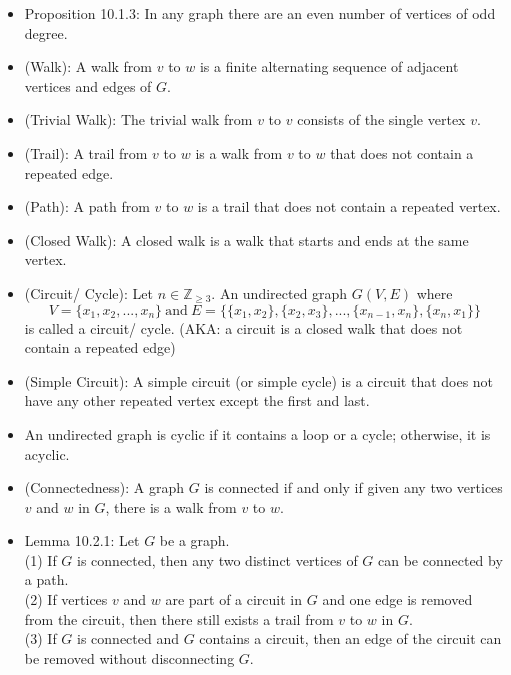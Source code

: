 \documentclass{article}
\begin{document}
\begin{itemize}
    \item Proposition 10.1.3: In any graph there are an even number of vertices of odd degree.
    \item (Walk): A walk from $v$ to $w$ is a finite alternating sequence of adjacent vertices and edges of $G$.
    \item (Trivial Walk): The trivial walk from $v$ to $v$ consists of the single vertex $v$.
    \item (Trail): A trail from $v$ to $w$ is a walk from $v$ to $w$ that does not contain a repeated edge.
    \item (Path): A path from $v$ to $w$ is a trail that does not contain a repeated vertex.
    \item (Closed Walk): A closed walk is a walk that starts and ends at the same vertex.
    \item (Circuit/ Cycle): Let $n\in \mathbb{Z}_{\geqslant 3}$. An undirected graph $G(V, E)$ where 
        \begin{equation*}
            V=\{x_1,x_2,...,x_n\}\ \text{and}\ E=\{\{x_1,x_2\},\{x_2,x_3\},...,\{x_{n-1},x_n\},\{x_n,x_1\}\}
        \end{equation*}
        is called a circuit/ cycle. (AKA: a circuit is a closed walk that does not contain a repeated edge)
    \item (Simple Circuit): A simple circuit (or simple cycle) is a circuit that does not have any other repeated vertex except the first and last.
    \item An undirected graph is cyclic if it contains a loop or a cycle; otherwise, it is acyclic.
    \item (Connectedness): A graph $G$ is connected if and only if given any two vertices $v$ and $w$ in $G$, there is a walk from $v$ to $w$.
    \item Lemma 10.2.1: Let $G$ be a graph.
        \\ \hspace*{2.5mm} (1) If $G$ is connected, then any two distinct vertices of $G$ can be connected by a path.
        \\ \hspace*{2.5mm} (2) If vertices $v$ and $w$ are part of a circuit in $G$ and one edge is removed from the circuit, then there still \hspace*{8.5mm} exists a trail from $v$ to $w$ in $G$.
        \\ \hspace*{3mm} (3) If $G$ is connected and $G$ contains a circuit, then an edge of the circuit can be removed without disconnecting \hspace*{8.5mm} $G$.

\end{itemize}
\end{document}
